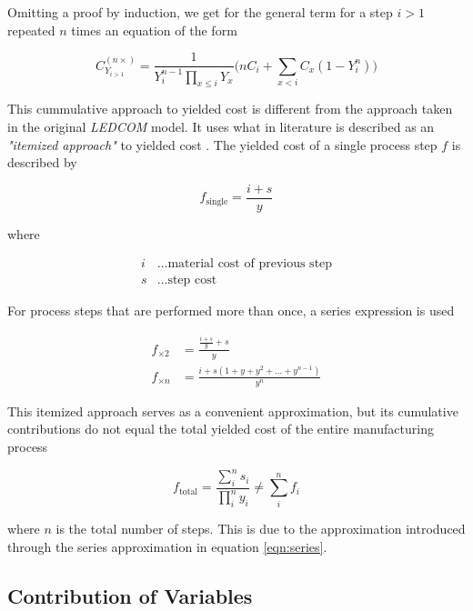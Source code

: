 \documentclass{article}
\begin{document}
Omitting a proof by induction, we get for the general term for a step $i>1$ repeated $n$ times an equation of the form

\begin{equation}
\label{eqn:yielded_cost}
    C_{Y_{i>1}}^{(n \times)} = \frac{1}{Y_i^{n-1} \prod_{x \leq i} Y_x} \bigg( nC_i + \sum_{x < i} C_x (1-Y_i^n) \bigg)
\end{equation}

This cummulative approach to yielded cost is different from the approach taken in the original \textit{LEDCOM} model. It uses what in literature is described as an \textit{"itemized approach"} to yielded cost \cite{becker2001use}. The yielded cost of a single process step $f$ is described by

\begin{equation}
	f_\text{single} = \frac{i+s}{y}
\end{equation}

where

\begin{align*}
    i &\dots \text{material cost of previous step} \\
    s &\dots \text{step cost}
\end{align*}

For process steps that are performed more than once, a series expression is used

\begin{align}
\label{eqn:series}
    f_{\times 2} &=  \frac{\frac{i+s}{y}+s}{y} \\
    f_{\times n} &= \frac{i + s(1+y+y^2+ \dots + y^{n-1})}{y^n}
\end{align}

This itemized approach serves as a convenient approximation, but its cumulative contributions do not equal the total yielded cost of the entire manufacturing process

\begin{equation}
    f_\text{total} = \frac{\sum_i^n s_i}{\prod_i^ny_i} \neq \sum_i^n f_i
\end{equation}

where $n$ is the total number of steps. This is due to the approximation introduced through the series approximation in equation \ref{eqn:series}.

\subsection{Contribution of Variables}
\end{document}
